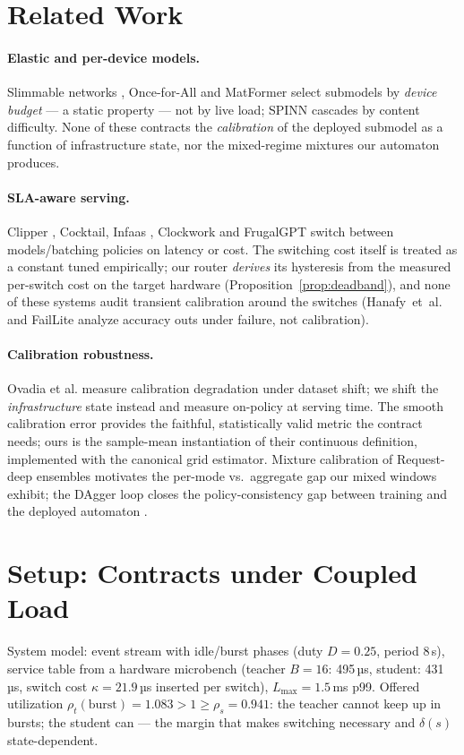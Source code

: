 \documentclass[sigconf,nonacm]{acmart}
\newcommand{\delt}{\delta}
\begin{document}
\section{Related Work}
\label{sec:related}
\paragraph{Elastic and per-device models.} Slimmable networks
\citep{yu2019slimmable}, Once-for-All \citep{cai2020ofa} and
MatFormer \citep{kalyaniwala2023matformer} select submodels by
\emph{device budget} — a static property — not by live load; SPINN
\citep{matsubara2022spinn} cascades by content difficulty. None of
these contracts the \emph{calibration} of the deployed submodel as a
function of infrastructure state, nor the mixed-regime mixtures our
automaton produces.
\paragraph{SLA-aware serving.} Clipper \citep{clipper2017},
Cocktail, Infaas \citep{infaas2020}, Clockwork \citep{gujrati2020clockwork}
and FrugalGPT \citep{chen2023frugalgpt} switch between models/batching
policies on latency or cost. The switching cost itself is treated as a
constant tuned empirically; our router \emph{derives} its hysteresis
from the measured per-switch cost on the target hardware
(Proposition~\ref{prop:deadband}), and none of these systems audit
transient calibration around the switches
(Hanafy~et~al.\ \citep{hanafy2023milcom} and FailLite analyze accuracy
outs under failure, not calibration).
\paragraph{Calibration robustness.} Ovadia et al.
\citep{ovadia2019trust} measure calibration degradation under dataset
shift; we shift the \emph{infrastructure} state instead and measure
on-policy at serving time. The smooth calibration error \citep{blasiok2023smooth}
provides the faithful, statistically valid metric the contract needs;
ours is the sample-mean instantiation of their continuous definition,
implemented with the canonical grid estimator. Mixture calibration of
Request-deep ensembles \citep{pleiss2017mixtures} motivates the
per-mode vs.\ aggregate gap our mixed windows exhibit; the DAgger loop
\citep{ross2011dagger} closes the policy-consistency gap between
training and the deployed automaton \citep{ross2011dagger}.

\section{Setup: Contracts under Coupled Load}
\label{sec:setup}
System model: event stream with idle/burst phases (duty $D{=}0.25$, period
8\,s), service table from a hardware microbench (teacher $B{=}16$: 495\,µs,
student: 431\,µs, switch cost $\kappa{=}21.9$\,µs inserted per switch),
$L_{\max}{=}1.5$\,ms p99. Offered utilization
$\rho_t(\mathrm{burst}){=}1.083 > 1 \ge \rho_s{=}0.941$: the teacher cannot
keep up in bursts; the student can — the margin that makes switching
necessary and $\delt(s)$ state-dependent.
\end{document}
